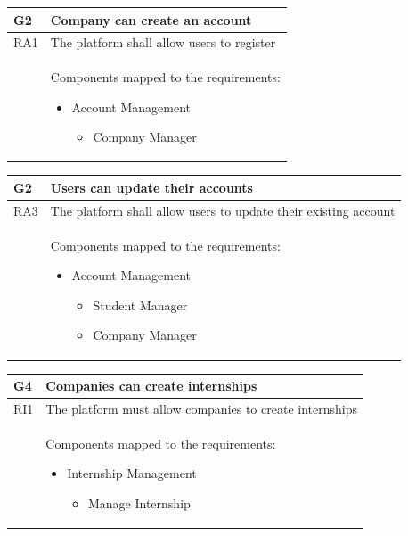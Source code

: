 \documentclass[11pt,twoside]{article}
\begin{document}
\begin{table}[H]
\begin{tabular}{| p{} | p{} |}
\hline
\rowcolor{Gray1}
\textbf{G2} & \textbf{Company can create an account} \\
\hline
\rowcolor{Gray2}
RA1 & The platform shall allow users to register \\
\hline
 & Components mapped to the requirements:
\begin{itemize}
\item Account Management
 	\begin{itemize}
 	\item Company Manager
 	\end{itemize}
\end{itemize} \\
\hline
\end{tabular}
\end{table}

\begin{table}[H]
\begin{tabular}{| p{} | p{} |}
\hline
\rowcolor{Gray1}
\textbf{G2} & \textbf{Users can update their accounts} \\
\hline
\rowcolor{Gray2}
RA3 & The platform shall allow users to update their existing account \\
\hline
 & Components mapped to the requirements:
\begin{itemize}
\item Account Management
 	\begin{itemize}
 	\item Student Manager
	\item Company Manager
 	\end{itemize}
\end{itemize} \\
\hline
\end{tabular}
\end{table}

\begin{table}[H]
\begin{tabular}{| p{} | p{} |}
\hline
\rowcolor{Gray1}
\textbf{G4} & \textbf{Companies can create internships} \\
\hline
\rowcolor{Gray2}
RI1 & The platform must allow companies to create internships \\
\hline
 & Components mapped to the requirements:
\begin{itemize}
\item Internship Management
 	\begin{itemize}
 	\item Manage Internship
 	\end{itemize}
\end{itemize} \\
\hline
\end{tabular}
\end{table}
\end{document}
